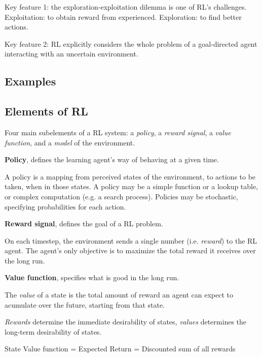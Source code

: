 \documentclass[lang=en,mode=geye,device=normal,color=blue,14pt]{elegantnote}
\DeclareMathOperator*{\1}{\mathbbm{1}}
\begin{document}
Key feature 1: the exploration-exploitation dilemma is one of RL's challenges.
Exploitation: to obtain reward from experienced.
Exploration: to find better actions.

Key feature 2: RL explicitly considers the whole problem of a goal-directed agent interacting with an uncertain environment.

\subsection{Examples}
\subsection{Elements of RL}

Four main subelements of a RL system: a \textit{policy}, a \textit{reward signal}, a \textit{value function}, and a \textit{model} of the environment.

\begin{definition}
\textbf{Policy}, defines the learning agent's way of behaving at a given time.
\end{definition}

A policy is a mapping from perceived states of the environment, to actions to be taken, when in those states.
A policy may be a simple function or a lookup table, or complex computation (e.g. a search process).
Policies may be stochastic, specifying probabilities for each action.

\begin{definition}
\textbf{Reward signal}, defines the goal of a RL problem.
\end{definition}

On each timestep, the environment sends a single number (i.e. \textit{reward}) to the RL agent. The agent's only objective is to maximize the total reward it receives over the long run.

\begin{definition}
\textbf{Value function}, specifies what is good in the long run.
\end{definition}

The \textit{value} of a state is the total amount of reward an agent can expect to acumulate over the future, starting from that state.

\textit{Rewards} determine the immediate desirability of states, \textit{values} determines the long-term desirability of states.

State Value function = Expected Return = Discounted sum of all rewards
\end{document}
